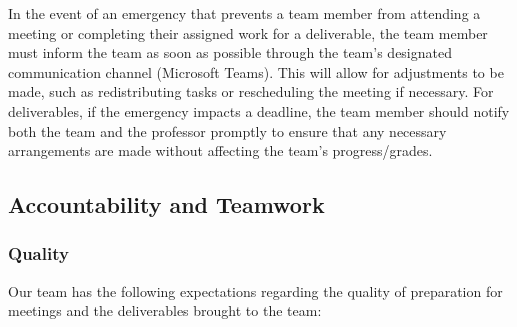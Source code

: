 \documentclass{article}
\begin{document}
In the event of an emergency that prevents a team member from attending a meeting or completing
their assigned work for a deliverable, the team member must inform the team as soon as possible
through the team's designated communication channel (Microsoft Teams). This will
allow for adjustments to be made, such as redistributing tasks or rescheduling the meeting if necessary.
For deliverables, if the emergency impacts a deadline, the team member should notify both the team and the professor promptly to ensure that any necessary
arrangements are made without affecting the team's progress/grades.

\subsection*{Accountability and Teamwork}

\subsubsection*{Quality}
Our team has the following expectations regarding the quality of preparation for meetings and the deliverables brought to the team:
\end{document}
